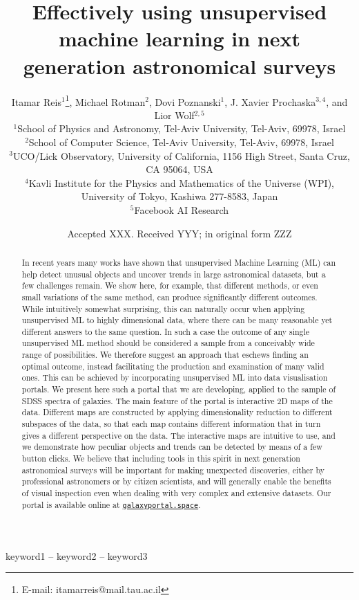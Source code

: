 \documentclass[fleqn,usenatbib]{mnras}
\title[UML in Astronomy]{Effectively using unsupervised machine learning in next generation astronomical surveys}
\author[I. Reis et al.]{
Itamar Reis$^{1}$\thanks{E-mail: itamarreis@mail.tau.ac.il},
Michael Rotman$^{2}$,
Dovi Poznanski$^{1}$,
J. Xavier Prochaska$^{3,4}$, \newauthor 
and Lior Wolf$^{2,5}$
\\
$^{1}$School of Physics and Astronomy, Tel-Aviv University, Tel-Aviv, 69978, Israel\\
$^{2}$School of Computer Science, Tel-Aviv University, Tel-Aviv, 69978, Israel\\
$^{3}$UCO/Lick Observatory, University of California, 1156 High Street, Santa Cruz, CA 95064, USA\\
$^{4}$Kavli Institute for the Physics and Mathematics of the Universe (WPI), University of Tokyo, Kashiwa 277-8583, Japan\\
$^{5}$Facebook AI Research
}
\date{Accepted XXX. Received YYY; in original form ZZZ}
\newcommand{\gtoast}{\href{https://galaxyportal.space/}{\texttt{galaxyportal.space}}}
\begin{document}
\label{firstpage}
\pagerange{\pageref{firstpage}--\pageref{lastpage}}
\maketitle

\begin{abstract}
In recent years  many works have shown that unsupervised Machine Learning (ML)  can help detect unusual objects and uncover trends in large astronomical datasets, but a few challenges remain. We show here, for example, that different methods, or even small variations  of the same method, can produce significantly different outcomes.  While intuitively somewhat surprising, this can naturally occur when applying unsupervised ML to highly dimensional data, where there can be many reasonable yet different answers to the same question.  In such a case the  outcome of any single unsupervised ML method should be considered  a sample from  a conceivably wide range of possibilities. We therefore suggest an approach that eschews finding an optimal outcome,  instead facilitating the production and examination of many valid ones. This can be  achieved by incorporating unsupervised ML into data visualisation portals. We present here such a portal that we are developing, applied to the sample of SDSS spectra of galaxies. The main feature of the portal is interactive 2D maps of the data. Different maps are constructed by applying  dimensionality reduction to different subspaces of the data, so that each map contains different information that in turn gives a different perspective on the data.  The interactive maps are intuitive to use, and we demonstrate how peculiar objects and trends can be detected by means of a few button clicks. We believe that including tools in this spirit in  next generation astronomical surveys will be important for making unexpected discoveries, either by professional astronomers or by citizen scientists, and will generally enable the benefits of visual inspection even when dealing with very complex and extensive datasets. Our portal is available online at \gtoast.

\end{abstract}

\begin{keywords}
keyword1 -- keyword2 -- keyword3
\end{keywords}

\end{document}
